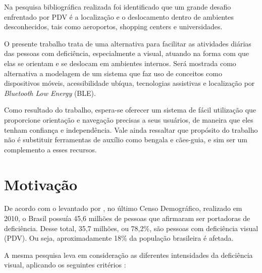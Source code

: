 \documentclass[english,brazilian]{UNISINOSmonografia}
\begin{document}
Na pesquisa bibliográfica realizada foi identificado que um grande desafio enfrentado por PDV é a localização e o deslocamento dentro de ambientes desconhecidos, tais como aeroportos, shopping centers e universidades.

O presente trabalho trata de uma alternativa para facilitar as atividades diárias das pessoas com deficiência, especialmente a visual, atuando na forma com que elas se orientam e se deslocam em ambientes internos.
Será mostrada como alternativa a modelagem de um sistema que faz uso de conceitos como dispositivos móveis, acessibilidade ubíqua, tecnologias assistivas e localização por \textit{Bluetooth Low Energy} (BLE).

Como resultado do trabalho, espera-se oferecer um sistema de fácil utilização que proporcione orientação e navegação precisas a seus usuários, de maneira que eles tenham confiança e independência. Vale ainda ressaltar que propósito do trabalho não é substituir ferramentas de auxílio como bengala e cães-guia, e sim ser um complemento a esses recursos.

	\section{Motivação}


De acordo com o levantado por , no último Censo Demográfico, realizado em 2010, o Brasil possuía 45,6 milhões de pessoas que afirmaram ser portadoras de deficiência. Desse total, 35,7 milhões, ou 78,2\%, são pessoas com deficiência visual (PDV). Ou seja, aproximadamente 18\% da população brasileira é afetada.

A mesma pesquisa leva em consideração as diferentes intensidades da deficiência visual, aplicando os seguintes critérios \cite{IBGE2010}: 
\end{document}
